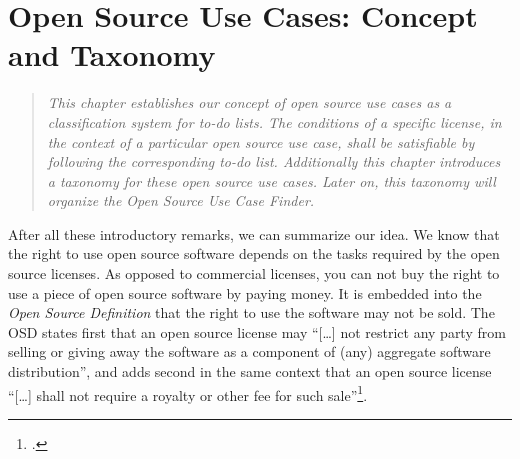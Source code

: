 %
%
%
%
%



\chapter{Open Source Use Cases: Concept and Taxonomy}\label{sec:OSUCdeduction}

\footnotesize \begin{quote}\itshape This chapter establishes our concept of
\emph{open source use cases} as a classification system for to-do lists. The
conditions of a specific license, in the context of a par\-ti\-cu\-lar
\emph{open source use case}, shall be satisfiable by following the corresponding
to-do list. Additionally this chapter introduces a taxonomy for these \emph{open
source use cases}. Later on, this taxonomy will organize the \emph{Open Source
Use Case Finder}.
\end{quote}
\normalsize{}

After all these introductory remarks, we can summarize our idea. We know that
the right to use open source software depends on the tasks required by the open
source licenses. As opposed to commercial licenses, you can not buy the right to
use a piece of open source software by paying money. It is embedded into the
\emph{Open Source Definition} that the right to use the software may not be
sold. The OSD states first that an open source license may \enquote{[\ldots]
not restrict any party from selling or giving away the software as a component
of (any) aggregate software distribution}, and adds second in the same context
that an open source license \enquote{[\ldots] shall not require a royalty or
other fee for such sale}\footcite[cf.][\nopage wp §1]{OSI2012a}.

